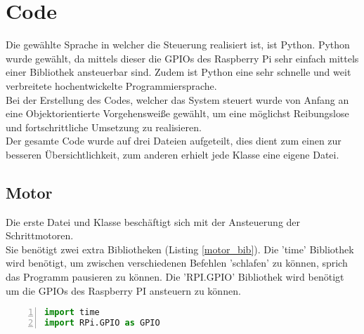 
\chapter{Code}\label{chap:code}
Die gewählte Sprache in welcher die Steuerung realisiert ist, ist Python. Python wurde gewählt, da mittels dieser die \acp{GPIO} des Raspberry Pi sehr einfach mittels einer Bibliothek ansteuerbar sind. Zudem ist Python eine sehr schnelle und weit verbreitete hochentwickelte Programmiersprache.\\
Bei der Erstellung des Codes, welcher das System steuert wurde von Anfang an eine Objektorientierte Vorgehensweiße gewählt, um eine möglichst Reibungslose und fortschrittliche Umsetzung zu realisieren.\\
Der gesamte Code wurde auf drei Dateien aufgeteilt, dies dient zum einen zur besseren Übersichtlichkeit, zum anderen erhielt jede Klasse eine eigene Datei.
\section{Motor}
Die erste Datei und Klasse beschäftigt sich mit der Ansteuerung der Schrittmotoren.\\
Sie benötigt zwei extra Bibliotheken (Listing \ref{motor_bib}). Die 'time' Bibliothek wird benötigt, um zwischen verschiedenen Befehlen 'schlafen' zu können, sprich das Programm pausieren zu können. Die 'RPI.GPIO' Bibliothek wird benötigt um die \acp{GPIO} des Raspberry PI ansteuern zu können. 
\begin{lstlisting}[caption={Bibliotheken der Motor Klasse}, language={Python}, label={motor_bib}, numbers=left]
import time
import RPi.GPIO as GPIO	
\end{lstlisting}

